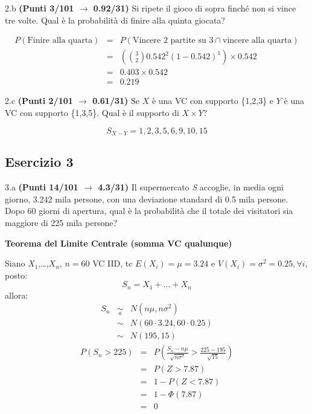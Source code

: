 \documentclass[
  11pt,
]{book}
\theoremstyle{mytheoremstyle}
\theoremstyle{mydefstyle}
\newenvironment{sol}
  {
  \begin{tcolorbox}[enhanced,breakable,arc=0.1mm,boxrule=1pt,colback=white,colframe=iblue,
  title=\bf \fontfamily{lmss}\selectfont \hspace{.5 cm} Soluzione,drop fuzzy shadow]

}{
\end{tcolorbox}
  }
\begin{document}
2.b \textbf{(Punti 3/101 \(\rightarrow\) 0.92/31)} Si ripete il gioco di sopra finché non si vince tre volte. Qual è la probabilità di finire alla quinta giocata?

\begin{sol}
\begin{eqnarray*}
  P(\text{Finire alla quarta}) &=&  P(\text{Vincere 2 partite su 3}\cap\text{vincere alla quarta})\\
  &=& \left(\binom{3}{2}0.542^2(1-0.542)^1\right)\times 0.542\\
  &=& 0.403\times 0.542\\
  &=& 0.219
\end{eqnarray*}

\end{sol}

2.c \textbf{(Punti 2/101 \(\rightarrow\) 0.61/31)} Se \(X\) è una VC con supporto \{1,2,3\} e \(Y\) è una VC con
supporto \{1,3,5\}.
Qual è il supporto di \(X\times Y\)?

\begin{sol}
\[S_{X-Y}=1, 2, 3, 5, 6, 9, 10, 15\]

\end{sol}

\subsection{Esercizio 3}\label{esercizio-3-18}

3.a \textbf{(Punti 14/101 \(\rightarrow\) 4.3/31)} Il supermercato \emph{S} accoglie, in media ogni giorno, 3.242 mila persone, con una
deviazione standard di 0.5 mila persone. Dopo 60 giorni di apertura, qual è la probabilità che il
totale dei visitatori sia maggiore di 225 mila persone?

\textbf{Teorema del Limite Centrale (somma VC qualunque)}

Siano \(X_1\),\ldots,\(X_n\), \(n=60\) VC IID, tc \(E(X_i)=\mu=3.24\) e \(V(X_i)=\sigma^2=0.25,\forall i\), posto:
\[
      S_n = X_1 + ... + X_n
      \]
allora:\begin{eqnarray*}
  S_n & \mathop{\sim}\limits_{a}& N(n\mu,n\sigma^2) \\
     &\sim & N(60\cdot3.24,60\cdot0.25) \\
     &\sim & N(195,15) 
  \end{eqnarray*}\begin{eqnarray*}
      P( S_n   >   225 ) 
        &=& P\left(  \frac { S_n  -  n\mu }{ \sqrt{n\sigma^2} }  >  \frac { 225  -  195 }{\sqrt{ 15 }} \right)  \\
                 &=& P\left(  Z   >   7.87 \right) \\    &=& 1-P(Z< 7.87 )\\ 
                 &=&  1-\Phi( 7.87 ) \\ &=&  0 
      \end{eqnarray*}
\end{document}
